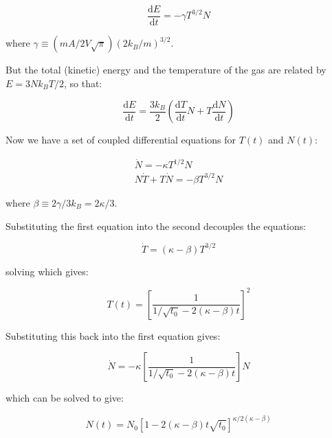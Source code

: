 \documentclass[12pt]{article}
\begin{document}
\begin{equation}
    \frac{\mathrm{d}E}{\mathrm{d}t} = -\gamma T^{3/2} N
\end{equation}

where $\gamma \equiv (mA/2V\sqrt{\pi}) (2k_{B}/m)^{3/2}$.

But the total (kinetic) energy and the temperature of the gas are related by $E = 3Nk_{B}T/2$, so that:

\begin{equation}
    \frac{\mathrm{d}E}{\mathrm{d}t} = \frac{3k_{B}}{2} \left( \frac{\mathrm{d}T}{\mathrm{d}t} N + T \frac{\mathrm{d}N}{\mathrm{d}t} \right)
\end{equation}

Now we have a set of coupled differential equations for $T(t)$ and $N(t)$:

\begin{equation}
    \begin{split}
        \dot{N} = -\kappa T^{1/2} N \\
        N\dot{T} + T\dot{N} = -\beta T^{3/2} N
    \end{split}
\end{equation}

where $\beta \equiv 2\gamma/3k_{B} = 2\kappa/3$.

Substituting the first equation into the second decouples the equations:

\begin{equation}
    \dot{T} = (\kappa - \beta) T^{3/2}
\end{equation}

solving which gives:

\begin{equation}
    T(t) = \left[ \frac{1}{1/\sqrt{t_{0}} - 2(\kappa - \beta) t} \right]^{2}
\end{equation}

Substituting this back into the first equation gives:

\begin{equation}
    \dot{N} = -\kappa \left[ \frac{1}{1/\sqrt{t_{0}} - 2(\kappa - \beta) t} \right] N
\end{equation}

which can be solved to give:

\begin{equation}
    N(t) = N_{0} \left[ 1 - 2(\kappa - \beta) t \sqrt{t_{0}} \right]^{\kappa/2(\kappa - \beta)}
\end{equation}

\pagebreak
\end{document}
